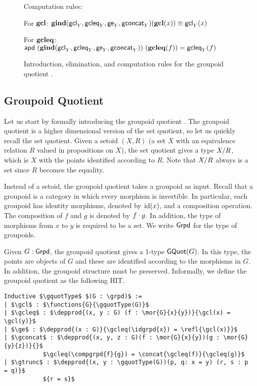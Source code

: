 \begin{figure*}
\vspace{5pt}

Computation rules:

For $\operatorname{\mathbf{gcl}}$: $\operatorname{\mathbf{gind}}(\mathsf{gcl}_Y, \mathsf{gcleq}_Y, \mathsf{ge}_Y, \mathsf{gconcat}_Y)(\operatorname{\mathbf{gcl}}(x)) \equiv \mathsf{gcl}_Y(x)$

For $\operatorname{\mathbf{gcleq}}$: $\mathsf{apd} \ (\operatorname{\mathbf{gind}}(\mathsf{gcl}_Y, \mathsf{gcleq}_Y, \mathsf{ge}_Y, \mathsf{gconcat}_Y)) \ (\operatorname{\mathbf{gcleq}}(f)) = \mathsf{gcleq}_Y(f)$
\caption{Introduction, elimination, and computation rules for the groupoid quotient \cite{sojakovaPhD}.}
\label{fig:gquot}
\end{figure*}
		
\subsection{Groupoid Quotient}
Let us start by formally introducing the groupoid quotient \cite{sojakovaPhD}.
The groupoid quotient is a higher dimensional version of the set quotient,
so let us quickly recall the set quotient.
Given a setoid $(X,R)$ (a set $X$ with an equivalence relation $R$ valued in propositions on $X$),
the set quotient gives a type ${X / R }$, which is $X$ with the points identified according to $R$.
Note that ${X / R }$ always is a set since $R$ becomes the equality.

Instead of a setoid, the groupoid quotient takes a groupoid as input.
Recall that a groupoid is a category in which every morphism is invertible.
In particular, each groupoid has identity morphisms, denoted by $\operatorname{id}(x)$, and a composition operation.
The composition of $f$ and $g$ is denoted by $f \cdot g$.
In addition, the type of morphisms from $x$ to $y$ is required to be a set.
We write $\mathsf{Grpd}$ for the type of groupoids.

Given $G : \mathsf{Grpd}$, the groupoid quotient gives a 1-type $\operatorname{\textsf{GQuot}}(G)$.
In this type, the points are objects of $G$
and these are identified according to the morphisms in $G$.
In addition, the groupoid structure must be preserved.
Informally, we define the groupoid quotient as the following HIT.

\begin{lstlisting}[mathescape=true]
Inductive $\gquotType$ $(G : \grpd)$ :=
| $\gcl$ : $\functions{G}{\gquotType(G)}$
| $\gcleq$ : $\depprod{(x, y : G) (f : \mor{G}{x}{y})}{\gcl(x) = \gcl(y)}$
| $\ge$ : $\depprod{(x : G)}{\gcleq(\idgrpd{x}) = \refl{\gcl(x)}}$
| $\gconcat$ : $\depprod{(x, y, z : G)(f : \mor{G}{x}{y})(g : \mor{G}{y}{z})}{}$
           $\gcleq(\compgrpd{f}{g}) = \concat{\gcleq(f)}{\gcleq(g)}$
| $\gtrunc$ : $\depprod{(x, y : \gquotType(G))(p, q: x = y) (r, s : p = q)}$
           ${r = s}$
\end{lstlisting}

